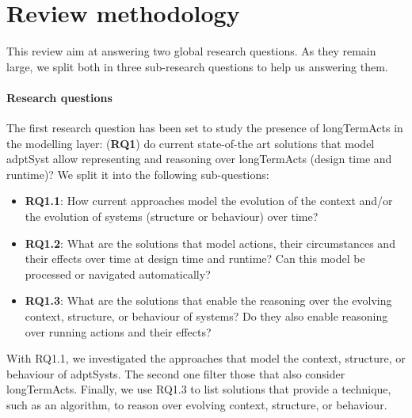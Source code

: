 \section{Review methodology}
\label{sec:sota:methodo}

This review aim at answering two global research questions.
As they remain large, we split both in three sub-research questions to help us answering them.

\paragraph{Research questions}
The first research question has been set to study the presence of \glspl{longTermAct} in the modelling layer: (\textbf{RQ1}) do current state-of-the art solutions that model \gls{adptSyst} allow representing and reasoning over \glspl{longTermAct} (design time and runtime)? 
We split it into the following sub-questions:
\begin{itemize}
	\item \textbf{RQ1.1}: How current approaches model the evolution of the \gls{context} and/or the evolution of systems (\gls{structure} or \gls{behaviour}) over time?
	\item \textbf{RQ1.2}: What are the solutions that model \glspl{action}, their \glspl{circumstance} and their effects over time at design time and runtime? Can this model be processed or navigated automatically?
	\item \textbf{RQ1.3}: What are the solutions that enable the reasoning over the evolving \gls{context}, \gls{structure}, or \gls{behaviour} of systems? Do they also enable reasoning over running \glspl{action} and their effects?
\end{itemize}
With RQ1.1, we investigated the approaches that model the \gls{context}, \gls{structure}, or \gls{behaviour} of \glspl{adptSyst}.
The second one filter those that also consider \glspl{longTermAct}.
Finally, we use RQ1.3 to list solutions that provide a technique, such as an algorithm, to reason over evolving \gls{context}, \gls{structure}, or \gls{behaviour}.

